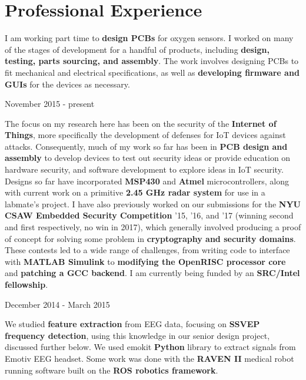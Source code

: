 \documentclass{my_resume}
\begin{document}
\section{Professional Experience}
\begin{flushleft}
I am working part time to \textbf{design PCBs} for oxygen sensors.
I worked on many of the stages of development for a handful of products, including \textbf{design, testing, parts sourcing, and assembly}.
The work involves designing PCBs to fit mechanical and electrical specifications, as well as \textbf{developing firmware and GUIs} for the devices as necessary.
\end{flushleft}
    {November 2015 - present}
\begin{flushleft}
The focus on my research here has been on the security of the \textbf{Internet of Things}, more specifically the development of defenses for IoT devices against attacks.
Consequently, much of my work so far has been in \textbf{PCB design and assembly} to develop devices to test out security ideas or provide education on hardware security, and software development to explore ideas in IoT security.
Designs so far have incorporated \textbf{MSP430} and \textbf{Atmel} microcontrollers, along with current work on a primitive \textbf{2.45 GHz radar system} for use in a labmate's project.
I have also previously worked on our submissions for the \textbf{NYU CSAW Embedded Security Competition} '15, '16, and '17 (winning second and first respectively, no win in 2017), which generally involved producing a proof of concept for solving some problem in \textbf{cryptography and security domains}.
These contests led to a wide range of challenges, from writing code to interface with \textbf{MATLAB Simulink} to \textbf{modifying the OpenRISC processor core} and \textbf{patching a GCC backend}.
I am currently being funded by an \textbf{SRC/Intel fellowship}.
\end{flushleft}
	{December 2014 - March 2015}
\begin{flushleft}
We studied \textbf{feature extraction} from EEG data, focusing on \textbf{SSVEP frequency detection}, using this knowledge in our senior design project, discussed further below.
We used emokit \textbf{Python} library to extract signals from Emotiv EEG headset.
Some work was done with the \textbf{RAVEN II} medical robot running software built on the \textbf{ROS robotics framework}.
\end{flushleft}
\end{document}
